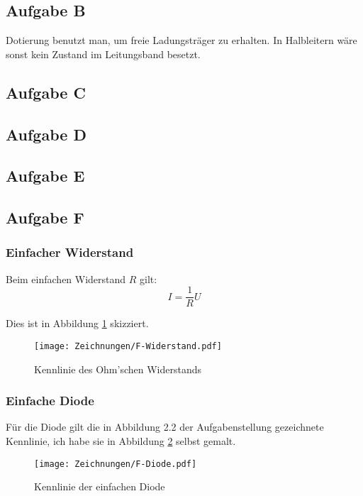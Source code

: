 \subsection{Aufgabe B}

Dotierung benutzt man, um freie Ladungsträger zu erhalten. In Halbleitern wäre
sonst kein Zustand im Leitungsband besetzt.

\subsection{Aufgabe C}

\fehlt

\subsection{Aufgabe D}

\fehlt

\subsection{Aufgabe E}

\fehlt

\subsection{Aufgabe F}

\subsubsection{Einfacher Widerstand}

Beim einfachen Widerstand $R$ gilt:
\[
	I = \frac 1R U
\]

Dies ist in Abbildung \ref{fig:F-Widerstand} skizziert.

\begin{figure}[h]
	\centering
	\caption{%
		Kennlinie des Ohm'schen Widerstands
	}
	\label{fig:F-Widerstand}
	\texttt{[image: Zeichnungen/F-Widerstand.pdf]}
\end{figure}

\subsubsection{Einfache Diode}

Für die Diode gilt die in Abbildung 2.2 der Aufgabenstellung gezeichnete
Kennlinie, ich habe sie in Abbildung \ref{fig:F-Diode} selbst gemalt.

\begin{figure}[h]
	\centering
	\caption{%
		Kennlinie der einfachen Diode
	}
	\label{fig:F-Diode}
	\texttt{[image: Zeichnungen/F-Diode.pdf]}
\end{figure}

